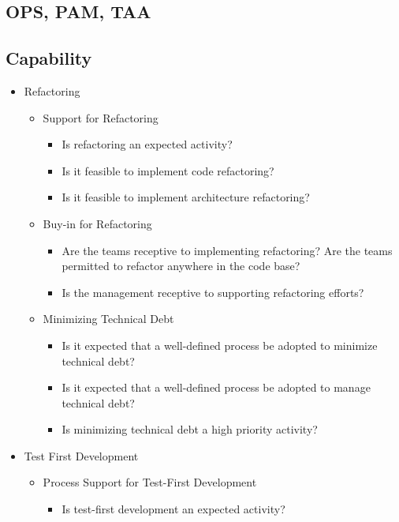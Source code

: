 \begin{appendices}
\chapter{OPS, PAM, TAA}

\section{Capability}

\begin{itemize}
	\item Refactoring
		\begin{itemize}
			\item Support for Refactoring 
				\begin{itemize}
					\item Is refactoring an expected activity?
					\item Is it feasible to implement code refactoring?
					\item Is it feasible to implement architecture refactoring?
				\end{itemize}
			\item Buy-in for Refactoring
				\begin{itemize}
					\item Are the teams receptive to implementing refactoring?
					\addition Are the teams permitted to refactor anywhere in the code base?
					\item Is the management receptive to supporting refactoring efforts?
				\end{itemize}
			\item Minimizing Technical Debt
				\begin{itemize}
					\item Is it expected that a well-defined process be adopted to minimize technical debt?
					\item Is it expected that a well-defined process be adopted to manage technical debt?
					\item Is minimizing technical debt a high priority activity?
				\end{itemize}
		\end{itemize}	
	\item Test First Development
		\begin{itemize}
			\item Process Support for Test-First Development
				\begin{itemize}
					\item Is test-first development an expected activity?

\end{itemize}
\end{itemize}
\end{itemize}
\end{appendices}
